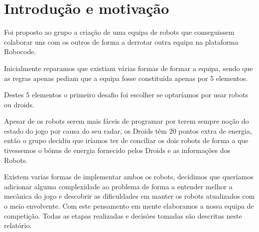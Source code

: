 \chapter{Introdução e motivação}


Foi proposto ao grupo a criação de uma equipa de robots que conseguissem colaborar uns com os outros de forma a derrotar outra equipa na plataforma Robocode.

Inicialmente reparamos que existiam várias formas de formar a equipa, sendo que as regras apenas pediam que a equipa fosse constituída apenas por 5 elementos.

Destes 5 elementos o primeiro desafio foi escolher se optaríamos por usar robots ou droids.

Apesar de os robots serem mais fáceis de programar por terem sempre noção do estado do jogo por causa do seu radar, os Droids têm 20 pontos extra de energia, então o grupo decidiu que iríamos ter de conciliar os dois robots de forma a que tivessemos o bónus de energia fornecido pelos Droids e as informações dos Robots.

Existem varias formas de implementar ambos os robots, decidimos que queríamos adicionar alguma complexidade ao problema de forma a entender melhor a mecânica do jogo e descobrir as dificuldades em manter os robots atualizados com o meio envolvente. Com este pensamento em mente elaboramos a nossa equipa de competição. Todas as etapas realizadas e decisões tomadas são descritas neste relatório.